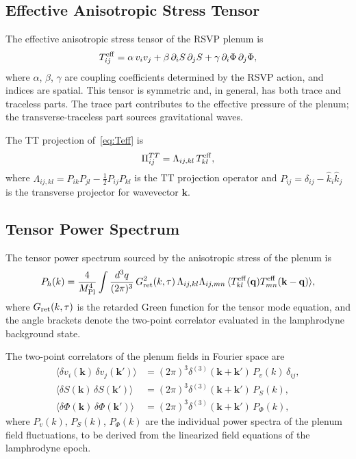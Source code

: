 \documentclass[12pt, a4paper]{article}
\newcommand{\Ph}{P_h}
\newcommand{\Teff}{T^{\rm eff}_{ij}}
\begin{document}
\subsection{Effective Anisotropic Stress Tensor}

The effective anisotropic stress tensor of the RSVP plenum is
\begin{equation}
\Teff = \alpha\,v_i v_j + \beta\,\partial_i S\,\partial_j S + \gamma\,\partial_i\Phi\,\partial_j\Phi,
\label{eq:Teff}
\end{equation}
where $\alpha$, $\beta$, $\gamma$ are coupling coefficients determined by the RSVP
action, and indices are spatial. This tensor is symmetric and, in general, has both
trace and traceless parts. The trace part contributes to the effective pressure of
the plenum; the transverse-traceless part sources gravitational waves.

The TT projection of~\eqref{eq:Teff} is
\begin{equation}
\Pi_{ij}^{TT} = \Lambda_{ij,kl}\,T^{\rm eff}_{kl},
\end{equation}
where $\Lambda_{ij,kl} = P_{ik}P_{jl} - \frac{1}{2}P_{ij}P_{kl}$ is the TT
projection operator and $P_{ij} = \delta_{ij} - \hat{k}_i\hat{k}_j$ is the
transverse projector for wavevector $\mathbf{k}$.

\subsection{Tensor Power Spectrum}

The tensor power spectrum sourced by the anisotropic stress of the plenum is
\begin{equation}
\Ph(k) = \frac{4}{M_{\rm Pl}^4}\int\frac{d^3q}{(2\pi)^3}\,
G^2_{\rm ret}(k, \tau)\,
\Lambda_{ij,kl}\Lambda_{ij,mn}\,
\langle T^{\rm eff}_{kl}(\mathbf{q})T^{\rm eff}_{mn}(\mathbf{k}-\mathbf{q})\rangle,
\label{eq:Ph}
\end{equation}
where $G_{\rm ret}(k, \tau)$ is the retarded Green function for the tensor mode
equation, and the angle brackets denote the two-point correlator evaluated in the
lamphrodyne background state.

The two-point correlators of the plenum fields in Fourier space are
\begin{align}
\langle\delta v_i(\mathbf{k})\,\delta v_j(\mathbf{k}')\rangle
&= (2\pi)^3\delta^{(3)}(\mathbf{k}+\mathbf{k}')\,P_v(k)\,\delta_{ij}, \\
\langle\delta S(\mathbf{k})\,\delta S(\mathbf{k}')\rangle
&= (2\pi)^3\delta^{(3)}(\mathbf{k}+\mathbf{k}')\,P_S(k), \\
\langle\delta\Phi(\mathbf{k})\,\delta\Phi(\mathbf{k}')\rangle
&= (2\pi)^3\delta^{(3)}(\mathbf{k}+\mathbf{k}')\,P_\Phi(k),
\end{align}
where $P_v(k)$, $P_S(k)$, $P_\Phi(k)$ are the individual power spectra of the
plenum field fluctuations, to be derived from the linearized field equations of the
lamphrodyne epoch.
\end{document}
